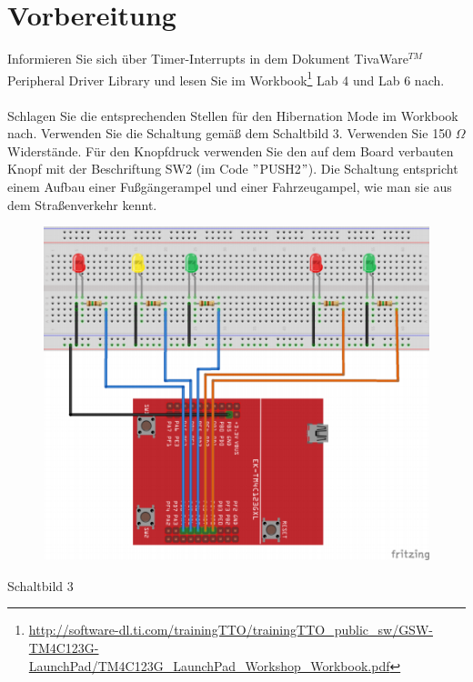\newpage
\section{Vorbereitung}
Informieren Sie sich über Timer-Interrupts in dem Dokument TivaWare$^{TM}$ Peripheral Driver Library und lesen Sie im Workbook\footnote{\url{http://software-dl.ti.com/trainingTTO/trainingTTO\_public\_sw/GSW-TM4C123G-LaunchPad/TM4C123G\_LaunchPad\_Workshop\_Workbook.pdf}} Lab 4 und Lab 6 nach.\\ \\
Schlagen Sie die entsprechenden Stellen für den Hibernation Mode im Workbook nach. Verwenden Sie die Schaltung gemä\ss{} dem Schaltbild 3. Verwenden Sie 150 $\Omega$ Widerstände. Für den Knopfdruck verwenden Sie den auf dem Board verbauten Knopf mit der Beschriftung SW2 (im Code $"$PUSH2$"$). Die Schaltung entspricht einem Aufbau einer Fu\ss{}gängerampel und einer Fahrzeugampel, wie man sie aus dem Stra\ss{}enverkehr kennt.\\
\begin{figure}[h]
	\centering
	\includegraphics[width=0.9\linewidth]{images/Schaltbild3}
	\label{fig:Schaltblid3}
\end{figure}
\begin{center}
	Schaltbild 3
\end{center}
\newpage
